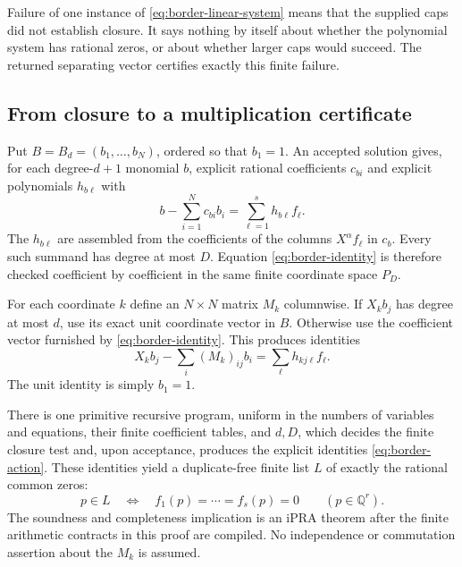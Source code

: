 Failure of one instance of \eqref{eq:border-linear-system} means that the
supplied caps did not establish closure. It says nothing by itself about
whether the polynomial system has rational zeros, or about whether larger
caps would succeed. The returned separating vector certifies exactly this
finite failure.

\subsection{From closure to a multiplication certificate}

Put $B=B_d=(b_1,\ldots,b_N)$, ordered so that $b_1=1$.
An accepted solution gives, for each degree-$d+1$ monomial $b$, explicit
rational coefficients $c_{bi}$ and explicit polynomials $h_{b\ell}$ with
\begin{equation}
       b-\sum_{i=1}^N c_{bi}b_i
                  =\sum_{\ell=1}^s h_{b\ell} f_\ell .
\label{eq:border-identity}
\end{equation}
The $h_{b\ell}$ are assembled from the coefficients of the columns
$X^\alpha f_\ell$ in $c_b$. Every such summand has degree at most $D$.
Equation \eqref{eq:border-identity} is therefore checked coefficient by
coefficient in the same finite coordinate space $P_D$.

For each coordinate $k$ define an $N\times N$ matrix $M_k$ columnwise.
If $X_kb_j$ has degree at most $d$, use its exact unit coordinate vector
in $B$. Otherwise use the coefficient vector furnished by
\eqref{eq:border-identity}. This produces identities
\begin{equation}
        X_k b_j-\sum_i(M_k)_{ij}b_i
                       =\sum_\ell h_{kj\ell}f_\ell.
\label{eq:border-action}
\end{equation}
The unit identity is simply $b_1=1$.

\begin{theorem}
\label{thm:border-producer}
There is one primitive recursive program, uniform in the numbers of
variables and equations, their finite coefficient tables, and $d,D$,
which decides the finite closure test and, upon acceptance, produces
the explicit identities \eqref{eq:border-action}. These identities yield
a duplicate-free finite list $L$ of exactly the rational common zeros:
\[
 p\in L\quad\Longleftrightarrow\quad
 f_1(p)=\cdots=f_s(p)=0\qquad(p\in\mathbb Q^r).
\]
The soundness and completeness implication is an iPRA theorem after
the finite arithmetic contracts in this proof are compiled.
No independence or commutation assertion about the $M_k$ is assumed.
\end{theorem}

